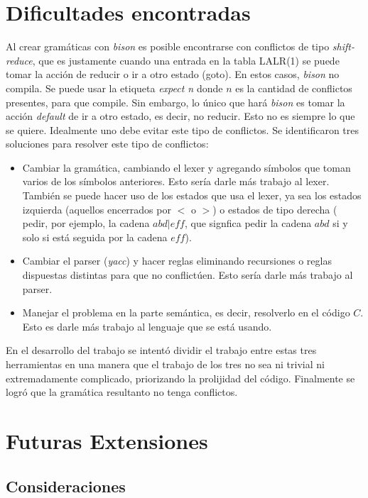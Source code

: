 \documentclass[a4paper,10pt]{article}
\begin{document}
\newpage

\section{Dificultades encontradas}

Al crear gramáticas con \textit{bison}  es posible encontrarse con conflictos de tipo \textit{shift-reduce}, que es justamente cuando una entrada 
en la tabla LALR(1) se puede tomar la acción de reducir o ir a otro estado (goto). En estos casos, \textit{bison} no compila. Se puede usar la 
etiqueta \textit{expect n} donde $n$ es la cantidad de conflictos presentes, para que compile. Sin embargo, lo único que hará \textit{bison} es tomar 
la acción \textit{default}  de ir a otro estado, es decir, no reducir. Esto no es siempre lo que se quiere. Idealmente uno debe evitar este tipo de 
conflictos. Se identificaron tres soluciones para resolver este tipo de conflictos:
\begin{itemize}
\item Cambiar la gramática, cambiando el lexer y agregando símbolos que toman varios de los símbolos anteriores. Esto sería darle más trabajo al lexer.
También  se puede hacer uso de los estados que usa el lexer, ya sea los estados izquierda (aquellos encerrados por $<$ o $>$) o estados de tipo derecha (
pedir, por ejemplo, la cadena $abd|eff$, que signfica pedir la cadena $abd$ si y solo si está seguida por la cadena $eff$). 
\item Cambiar el parser (\textit{yacc}) y hacer reglas eliminando recursiones  o reglas dispuestas distintas para que no conflictúen. Esto sería darle 
más trabajo al parser.
\item Manejar el problema en la parte semántica, es decir, resolverlo en el código $C$. Esto es darle más trabajo al lenguaje que se está usando.
\end{itemize}

En el desarrollo del trabajo se intentó dividir el trabajo entre estas tres herramientas en una manera que el trabajo de los tres no sea ni trivial ni 
extremadamente complicado, priorizando la prolijidad del código. Finalmente se logró que la gramática resultanto no tenga conflictos.


\newpage

\section{Futuras Extensiones}

\subsection{ Consideraciones }
\end{document}
